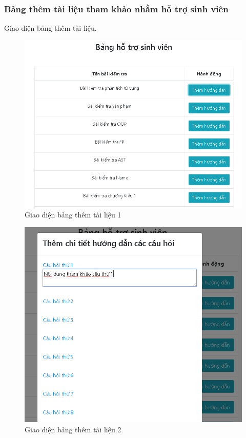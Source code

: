 \newpage
\subsubsection{Bảng thêm tài liệu tham khảo nhằm hỗ trợ sinh viên}

Giao diện bảng thêm tài liệu.

\begin{center}
	\begin{figure}[htp]
		\begin{center}
			\includegraphics[width=0.6\linewidth]{img/30}
		\end{center}
		\caption{Giao diện bảng thêm tài liệu 1}
		\label{refhinh62}
	\end{figure}
\end{center}

\begin{center}
	\begin{figure}[htp]
		\begin{center}
			\includegraphics[width=0.6\linewidth]{img/31}
		\end{center}
		\caption{Giao diện bảng thêm tài liệu 2}
		\label{refhinh63}
	\end{figure}
\end{center}

